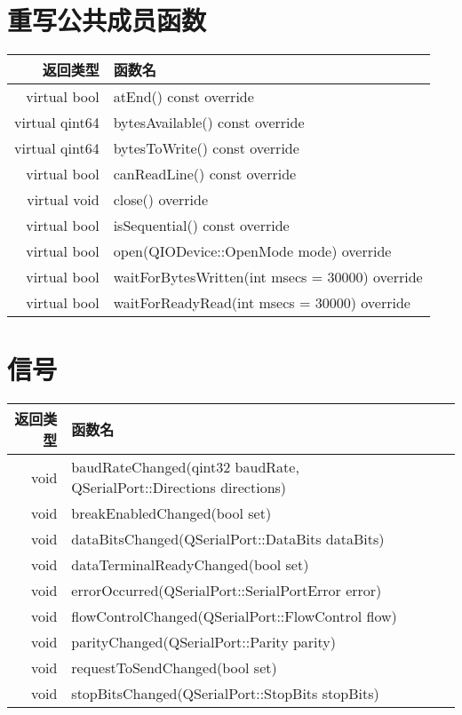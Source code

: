 \section{重写公共成员函数}

\begin{longtable}[l]{|r|m{25em}|}
	\hline
	返回类型&	函数名 \\ 
	\hline
	virtual bool 	&atEnd() const override \\ 
	\hline
virtual qint64&	bytesAvailable() const override \\ 
\hline
virtual qint64&	bytesToWrite() const override \\ 
\hline
virtual bool&	canReadLine() const override \\ 
\hline
virtual void&	close() override \\ 
\hline
virtual bool	&isSequential() const override \\ 
\hline
virtual bool&	open(QIODevice::OpenMode mode) override \\ 
\hline
virtual bool&	waitForBytesWritten(int msecs = 30000) override \\ 
\hline
virtual bool&	waitForReadyRead(int msecs = 30000) override \\
	\hline
\end{longtable}


\section{信号}

\begin{longtable}[l]{|r|l|}
\hline
返回类型&	函数名 \\ 
\hline
void	&baudRateChanged(qint32 baudRate, QSerialPort::Directions directions) \\ 
\hline
void	&breakEnabledChanged(bool set) \\ 
\hline
void	&dataBitsChanged(QSerialPort::DataBits dataBits) \\ 
\hline
void	&dataTerminalReadyChanged(bool set) \\ 
\hline
void	&errorOccurred(QSerialPort::SerialPortError error) \\  
\hline
void&	flowControlChanged(QSerialPort::FlowControl flow) \\ 
\hline
void&	parityChanged(QSerialPort::Parity parity) \\ 
\hline
void&	requestToSendChanged(bool set) \\ 
\hline
void&	stopBitsChanged(QSerialPort::StopBits stopBits) \\ 
\hline
\end{longtable}

